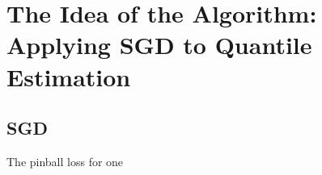\documentclass[11pt]{article}
\begin{document}
\section{The Idea of the Algorithm: Applying SGD to Quantile Estimation}

\subsection{SGD}

The pinball loss for one 
    
\end{document}
